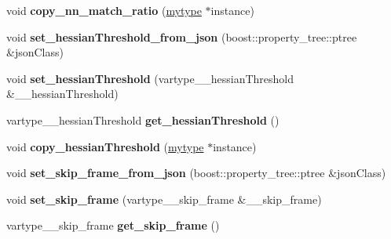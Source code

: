 \begin{DoxyCompactItemize}
\item 
\mbox{\label{classfilter_1_1algos_1_1_latch_debug_a2e7825094e5ac05883f1b4d3481164d8}} 
void {\bfseries copy\+\_\+nn\+\_\+match\+\_\+ratio} (\hyperlink{classfilter_1_1algos_1_1_latch_debug}{mytype} $\ast$instance)
\item 
\mbox{\label{classfilter_1_1algos_1_1_latch_debug_a455b099788fe754e0e8df95a5c3b0a51}} 
void {\bfseries set\+\_\+hessian\+Threshold\+\_\+from\+\_\+json} (boost\+::property\+\_\+tree\+::ptree \&json\+Class)
\item 
\mbox{\label{classfilter_1_1algos_1_1_latch_debug_a8bbcfcac43416244466b1b1929527a50}} 
void {\bfseries set\+\_\+hessian\+Threshold} (vartype\+\_\+\+\_\+hessian\+Threshold \&\+\_\+\+\_\+hessian\+Threshold)
\item 
\mbox{\label{classfilter_1_1algos_1_1_latch_debug_acbdb41559ab14d9ed41440367a4a8d17}} 
vartype\+\_\+\+\_\+hessian\+Threshold {\bfseries get\+\_\+hessian\+Threshold} ()
\item 
\mbox{\label{classfilter_1_1algos_1_1_latch_debug_a4f1d724d08a2a4c75b4562b51d6c4fae}} 
void {\bfseries copy\+\_\+hessian\+Threshold} (\hyperlink{classfilter_1_1algos_1_1_latch_debug}{mytype} $\ast$instance)
\item 
\mbox{\label{classfilter_1_1algos_1_1_latch_debug_ad74b4dfe7e693a952883b1cb11fafe2c}} 
void {\bfseries set\+\_\+skip\+\_\+frame\+\_\+from\+\_\+json} (boost\+::property\+\_\+tree\+::ptree \&json\+Class)
\item 
\mbox{\label{classfilter_1_1algos_1_1_latch_debug_a4b65091152150f51df3d2e455777499f}} 
void {\bfseries set\+\_\+skip\+\_\+frame} (vartype\+\_\+\+\_\+skip\+\_\+frame \&\+\_\+\+\_\+skip\+\_\+frame)
\item 
\mbox{\label{classfilter_1_1algos_1_1_latch_debug_a94f395815958b2bdcc374ca4b130bae7}} 
vartype\+\_\+\+\_\+skip\+\_\+frame {\bfseries get\+\_\+skip\+\_\+frame} ()

\end{DoxyCompactItemize}
